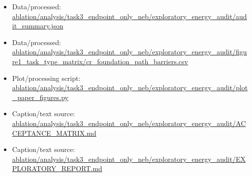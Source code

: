 \begin{itemize}[leftmargin=1.4em,noitemsep]
\item Data/processed: \begingroup\scriptsize\url{ablation/analysis/task3_endpoint_only_neb/exploratory_energy_audit/audit_summary.json}\endgroup
\item Data/processed: \begingroup\scriptsize\url{ablation/analysis/task3_endpoint_only_neb/exploratory_energy_audit/figure1_task_type_matrix/cr_foundation_path_barriers.csv}\endgroup
\item Plot/processing script: \begingroup\scriptsize\url{ablation/analysis/task3_endpoint_only_neb/exploratory_energy_audit/plot_paper_figures.py}\endgroup
\item Caption/text source: \begingroup\scriptsize\url{ablation/analysis/task3_endpoint_only_neb/exploratory_energy_audit/ACCEPTANCE_MATRIX.md}\endgroup
\item Caption/text source: \begingroup\scriptsize\url{ablation/analysis/task3_endpoint_only_neb/exploratory_energy_audit/EXPLORATORY_REPORT.md}\endgroup
\end{itemize}

